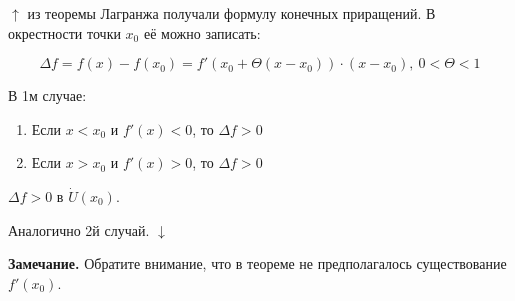 \documentclass{article}
\begin{document}
\(\uparrow\) из теоремы Лагранжа получали формулу конечных приращений. В окрестности точки \(x_0\) её можно записать:

\[\Delta f = f(x) - f(x_0) = f'(x_0 + \Theta(x-x_0)) \cdot (x-x_0),\ 0 < \Theta < 1\]

В 1м случае:
\begin{enumerate}
    \item Если \(x < x_0\) и \(f'(x) < 0\), то \(\Delta f > 0\)
    \item Если \(x > x_0\) и \(f'(x) > 0\), то \(\Delta f > 0\)
\end{enumerate}
\(\Delta f > 0\) в \(\dot{U}(x_0)\).

Аналогично 2й случай. \(\downarrow\)

\textbf{Замечание.} Обратите внимание, что в теореме не предполагалось существование \(f'(x_0)\).
\end{document}
